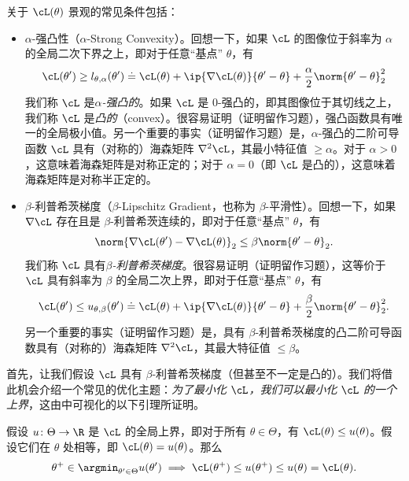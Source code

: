 \documentclass[../../book-main_zh.tex]{subfiles}
\begin{document}
关于 \(\cL(\theta)\) 景观的常见条件包括：
\begin{itemize}
    \item \(\alpha\)-强凸性（\(\alpha\)-Strong Convexity）。回想一下，如果 \(\cL\) 的图像位于斜率为 \(\alpha\) 的全局二次下界之上，即对于任意“基点” \(\theta\)，有
        \begin{equation}
            \cL(\theta^{\prime}) \geq l_{\theta,
            \alpha}(\theta^{\prime}) \doteq \cL(\theta) + \ip{\nabla
            \cL(\theta)}{\theta^{\prime} - \theta} +
            \frac{\alpha}{2}\norm{\theta^{\prime} - \theta}_{2}^{2}
        \end{equation}
        我们称 \(\cL\) 是\textit{\(\alpha\)-强凸的}。如果 \(\cL\) 是 \(0\)-强凸的，即其图像位于其切线之上，我们称 \(\cL\) 是\textit{凸的}（convex）。很容易证明（证明留作习题），强凸函数具有唯一的全局极小值。另一个重要的事实（证明留作习题）是，\(\alpha\)-强凸的二阶可导函数 \(\cL\) 具有（对称的）海森矩阵 \(\nabla^{2}\cL\)，其最小特征值 \(\geq \alpha\)。对于 \(\alpha > 0\)，这意味着海森矩阵是对称正定的；对于 \(\alpha = 0\)（即 \(\cL\) 是凸的），这意味着海森矩阵是对称半正定的。
    \item \(\beta\)-利普希茨梯度（\(\beta\)-Lipschitz Gradient，也称为 \(\beta\)-平滑性）。回想一下，如果 \(\nabla \cL\) 存在且是 \(\beta\)-利普希茨连续的，即对于任意“基点” \(\theta\)，有
        \begin{equation}
            \norm{\nabla \cL(\theta^{\prime}) - \nabla
            \cL(\theta)}_{2} \leq \beta \norm{\theta^{\prime} - \theta}_{2}.
        \end{equation}
        我们称 \(\cL\) 具有\textit{\(\beta\)-利普希茨梯度}。很容易证明（证明留作习题），这等价于 \(\cL\) 具有斜率为 \(\beta\) 的全局二次上界，即对于任意“基点” \(\theta\)，有
        \begin{equation}
            \cL(\theta^{\prime}) \leq u_{\theta,
            \beta}(\theta^{\prime}) \doteq \cL(\theta) + \ip{\nabla
            \cL(\theta)}{\theta^{\prime} - \theta} +
            \frac{\beta}{2}\norm{\theta^{\prime} - \theta}_{2}^{2}.
        \end{equation}
        另一个重要的事实（证明留作习题）是，具有 \(\beta\)-利普希茨梯度的凸二阶可导函数具有（对称的）海森矩阵 \(\nabla^{2}\cL\)，其最大特征值 \(\leq \beta\)。
\end{itemize}
首先，让我们假设 \(\cL\) 具有 \(\beta\)-利普希茨梯度（但甚至不一定是凸的）。我们将借此机会介绍一个常见的优化主题：\textit{为了最小化 \(\cL\)，我们可以最小化 \(\cL\) 的一个上界}，这由中可视化的以下引理所证明。
\begin{lemma}[主化-极小化]\label{lem:majorization_minimization}
    假设 \(u \colon \Theta \to \R\) 是 \(\cL\) 的全局上界，即对于所有 \(\theta \in \Theta\)，有 \(\cL(\theta) \leq u(\theta)\)。假设它们在 \(\theta\) 处相等，即 \(\cL(\theta) = u(\theta)\)。那么
    \begin{equation}
        \theta^{+} \in \argmin_{\theta^{\prime} \in
        \Theta}u(\theta^{\prime}) \implies \cL(\theta^{+}) \leq
        u(\theta^{+}) \leq u(\theta) = \cL(\theta).
    \end{equation}
\end{lemma}
\end{document}

